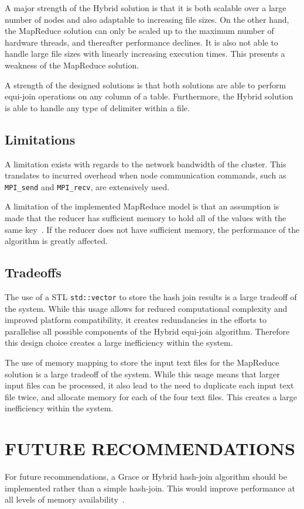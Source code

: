 \documentclass[12pt,twocolumn]{witseiepaper}
\begin{document}
A major strength of the Hybrid solution is that it is both scalable over a large number of nodes and also adaptable to increasing file sizes. On the other hand, the MapReduce solution can only be scaled up to the maximum number of hardware threads, and thereafter performance declines. It is also not able to handle large file sizes with linearly increasing execution times. This presents a weakness of the MapReduce solution.

A strength of the designed solutions is that both solutions are able to perform equi-join operations on any column of a table. Furthermore, the Hybrid solution is able to handle any type of delimiter within a file.

\subsection{Limitations}
A limitation exists with regards to the network bandwidth of the cluster. This translates to incurred overhead when node communication commands, such as \texttt{MPI\_send} and \texttt{MPI\_recv}, are extensively used.

A limitation of the implemented MapReduce model is that an assumption is made that the reducer has sufficient memory to hold all of the values with the same key~\cite{mapReduceJoin}. If the reducer does not have sufficient memory, the performance of the algorithm is greatly affected.

\subsection{Tradeoffs} \label{sec:tradeoffs}
The use of a STL \texttt{std::vector} to store the hash join results is a large tradeoff of the system. While this usage allows for reduced computational complexity and improved platform compatibility, it creates redundancies in the efforts to parallelise all possible components of the Hybrid equi-join algorithm. Therefore this design choice creates a large inefficiency within the system.

The use of memory mapping to store the input text files for the MapReduce solution is a large tradeoff of the system. While this usage means that larger input files can be processed, it also lead to the need to duplicate each input text file twice, and allocate memory for each of the four text files. This creates a large inefficiency within the system.

\section{FUTURE RECOMMENDATIONS}
For future recommendations, a Grace or Hybrid hash-join algorithm should be implemented rather than a simple hash-join. This would improve performance at all levels of memory availability~\cite{evaluating4JoinAlgorithms}.
\end{document}
